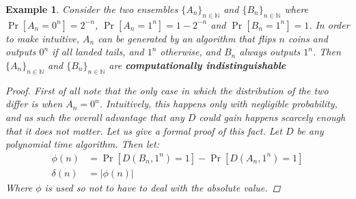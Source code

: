 \documentclass{article}
\newtheorem{example}{Example}
\begin{document}
\begin{example}
Consider the two ensembles $\{A_n\}_{n \in \mathbb{N}}$ and $\{B_n\}_{n \in \mathbb{N}}$ where $\Pr[A_n = 0^n] = 2^{-n}$, $\Pr[A_n = 1^n] = 1 - 2^{-n}$ and $\Pr[B_n = 1^n] = 1$. In order to make intuitive, $A_n$ can be generated by an algorithm that flips $n$ coins and outputs $0^n$ if all landed tails, and $1^n$ otherwise, and $B_n$ always outputs $1^n$. Then $\{A_n\}_{n \in \mathbb{N}}$ and $\{B_n\}_{n \in \mathbb{N}}$ are \textbf{computationally indistinguishable}
\begin{proof}
First of all note that the only case in which the distribution of the two differ is when $A_n = 0^n$. Intuitively, this happens only with negligible probability, and as such the overall advantage that any $D$ could gain happens scarcely enough that it does not matter. Let us give a formal proof of this fact. Let $D$ be any polynomial time algorithm. Then let: 
\begin{align*}
    \phi(n) &=  \Pr[D(B_n, 1^n) = 1] - \Pr[D(A_n, 1^n) = 1] \\
    \delta(n) &= \left| \phi(n) \right| 
\end{align*}
Where $\phi$ is used so not to have to deal with the absolute value. 


\end{proof}
\end{example}
\end{document}
